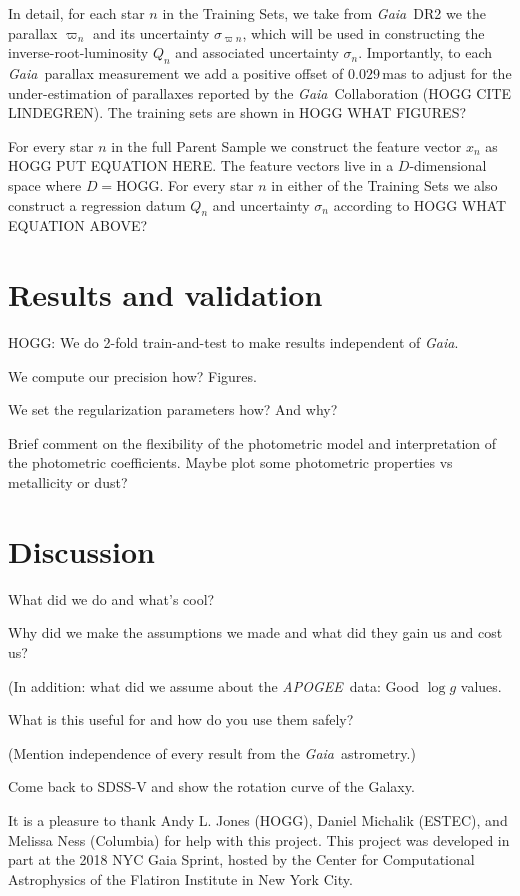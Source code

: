 \documentclass[modern]{aastex62}
\newcommand{\acronym}[1]{{\small{#1}}}
\newcommand{\project}[1]{\textsl{#1}}
\newcommand{\apogee}{\project{\acronym{APOGEE}}}
\newcommand{\gaia}{\project{Gaia}}
\newcommand{\logg}{\log g}
\begin{document}
In detail,
for each star $n$ in the Training Sets, we take from \gaia\ DR2 we the parallax $\varpi_n$
and its uncertainty $\sigma_{\varpi n}$, which will be used in
constructing the inverse-root-luminosity $Q_n$ and associated
uncertainty $\sigma_n$.
Importantly, to each \gaia\ parallax measurement we add a positive
offset of $0.029$\,mas to adjust for the under-estimation of
parallaxes reported by the \gaia\ Collaboration (HOGG CITE LINDEGREN).
The training sets are shown in HOGG WHAT FIGURES?

For every star $n$ in the full Parent Sample we construct the feature
vector $x_n$ as HOGG PUT EQUATION HERE.
The feature vectors live in a $D$-dimensional space where $D=$HOGG.
For every star $n$ in either of the Training Sets we also construct a
regression datum $Q_n$ and uncertainty $\sigma_n$ according to HOGG WHAT EQUATION ABOVE?

\section{Results and validation}

HOGG: We do 2-fold train-and-test to make results independent of \gaia.

We compute our precision how? Figures.

We set the regularization parameters how? And why?

Brief comment on the flexibility of the photometric model and interpretation of the photometric coefficients. Maybe plot some photometric properties vs metallicity or dust?

\section{Discussion}

What did we do and what's cool?

Why did we make the assumptions we made and what did they gain us and cost us?

(In addition: what did we assume about the \apogee\ data: Good $\logg$ values.

What is this useful for and how do you use them safely?

(Mention independence of every result from the \gaia\ astrometry.)

Come back to SDSS-V and show the rotation curve of the Galaxy.

\acknowledgements
It is a pleasure to thank
  Andy L. Jones (HOGG),
  Daniel Michalik (\acronym{ESTEC}), and
  Melissa Ness (Columbia)
for help with this project.
This project was developed in part at the
2018 \acronym{NYC} Gaia Sprint, hosted by the Center for Computational Astrophysics of
the Flatiron Institute in New York City.
\end{document}
